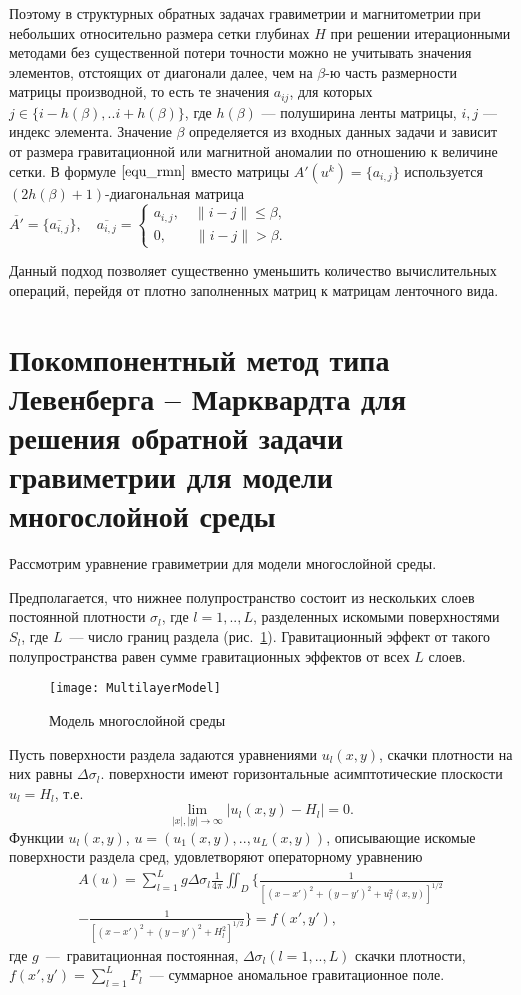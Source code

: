 Поэтому в структурных обратных задачах гравиметрии и магнитометрии при небольших относительно размера сетки глубинах $H$ при решении итерационными методами без существенной потери точности можно не учитывать значения элементов, отстоящих от диагонали далее, чем на  $\beta$-ю часть  размерности матрицы производной, то есть те значения $a_{ij}$, для которых  $j \in \{i-h(\beta),..i+h(\beta)\} $, где $h(\beta)$ --- полуширина ленты матрицы, $i, j$ --- индекс элемента. Значение $\beta$ определяется из входных данных задачи и зависит от размера гравитационной или магнитной аномалии по отношению к величине сетки. В формуле $\eqref{equ_rmn}$ вместо матрицы $A'(u^k)=\{a_{i,j}\}$ используется $(2h(\beta)+1)$-диагональная матрица $\overline{A'}=\{\overline{a_{i,j}}\}, \quad \overline{a_{i,j}}=
\begin{cases}
a_{i,j},\quad \| i-j\|\leq\beta, \\
0, \quad \quad \| i-j\|>\beta. 
\end{cases}$


Данный подход позволяет существенно уменьшить количество вычислительных операций, перейдя от плотно заполненных матриц к матрицам ленточного вида.

\newpage
\section{Покомпонентный метод типа Левенберга -- Марквардта для решения обратной задачи гравиметрии для модели многослойной среды}

Рассмотрим уравнение гравиметрии для модели многослойной среды. 

Предполагается, что нижнее полупространство состоит из нескольких слоев постоянной плотности $\sigma_l$, где $l=1,..,L$, разделенных искомыми поверхностями $S_l$, где $L$~--- число границ раздела (рис.~\ref{fig:multlayer}). Гравитационный эффект от такого полупространства равен сумме гравитационных эффектов от всех $L$ слоев.
\begin{figure}[h]
	\centering
	\texttt{[image: MultilayerModel]}
	\caption{Модель многослойной среды}
	\label{fig:multlayer}
\end{figure}
Пусть поверхности раздела задаются уравнениями $u_l(x,y)$, скачки плотности на них равны $\Delta\sigma_l$. поверхности имеют горизонтальные асимптотические плоскости $u_l=H_l$, т.е. $$\lim_{|x|,|y|\to\infty}|u_l(x,y)-H_l|=0.$$ Функции $u_l(x,y)$, $u=(u_1(x,y), .., u_L(x,y))$, описывающие искомые поверхности раздела сред, удовлетворяют операторному уравнению
\begin{equation}\label{equ_grav}
\begin{aligned}
A(u)=\sum_{l=1}^{L}g\Delta\sigma_l\frac{1}{4\pi}\iint_D\bigg\{\frac{1}{[(x-x')^2+(y-y')^2+u_l^2(x,y)]^{1/2}} \\
-\frac{1}{[(x-x')^2+(y-y')^2+H_l^2]^{1/2}}\bigg\}=f(x',y'),
\end{aligned}
\end{equation}
где $g$~---~гравитационная постоянная, $\Delta\sigma_l(l=1,..,L)$ скачки плотности, $f(x',y')=\sum_{l=1}^{L}F_l$~--- суммарное аномальное гравитационное поле. 

